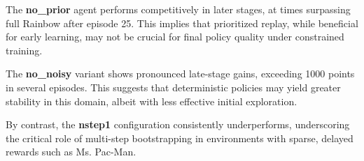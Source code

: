 \documentclass{article}
\begin{document}
The \textbf{no\_prior} agent performs competitively in later stages, at times surpassing full Rainbow after episode 25. This implies that prioritized replay, while beneficial for early learning, may not be crucial for final policy quality under constrained training.

The \textbf{no\_noisy} variant shows pronounced late-stage gains, exceeding 1000 points in several episodes. This suggests that deterministic policies may yield greater stability in this domain, albeit with less effective initial exploration.

By contrast, the \textbf{nstep1} configuration consistently underperforms, underscoring the critical role of multi-step bootstrapping in environments with sparse, delayed rewards such as Ms. Pac-Man.




\end{document}
